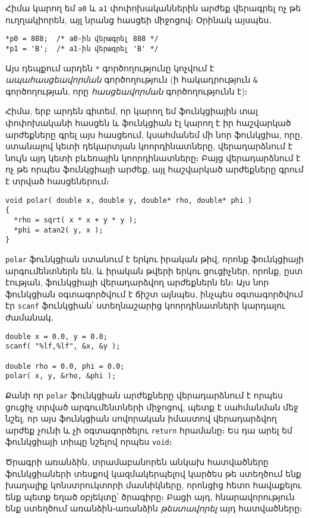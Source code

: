 Հիմա կարող եմ \texttt{a0} և \texttt{a1} փոփոխականներին արժեք վերագրել ոչ թե
ուղղակիորեն, այլ նրանց հասցեի միջոցով։ Օրինակ այսպես․

\begin{Verbatim}
*p0 = 888;  /* a0-ին վերագրել 888 */
*p1 = 'B';  /* a1-ին վերագրել 'B' */
\end{Verbatim}

Այս դեպքում արդեն \verb|*| գործողությունը կոչվում է \emph{ապահասցեավորման}
գործողություն (ի հակադրություն \verb|&| գործողության, որը \emph{հասցեավորման}
գործողությունն է)։

Հիմա, երբ արդեն գիտեմ, որ կարող եմ ֆունկցիային տալ փոփոխականի հասցեն և
ֆունկցիան էլ կարող է իր հաշվարկած արժեքները գրել այս հասցեում, կսահմանեմ
մի նոր ֆունկցիա, որը, ստանալով կետի դեկարտյան կոորդինատները, վերադարձնում
է նույն այդ կետի բևեռային կոորդինատները։ Բայց վերադարձնում է ոչ թե որպես
ֆունկցիայի արժեք, այլ հաշվարկած արժեքները գրում է տրված հասցեներում։

\begin{Verbatim}
void polar( double x, double y, double* rho, double* phi )
{
  *rho = sqrt( x * x + y * y );
  *phi = atan2( y, x );
}
\end{Verbatim}

\texttt{polar} ֆունկցիան ստանում է երկու իրական թիվ, որոնք ֆունկցիայի
արգումենտներն են, և իրական թվերի երկու ցուցիչներ, որոնք, ըստ էության,
ֆունկցիայի վերադարձվող արժեքներն են։ Այս նոր ֆունկցիան օգտագործվում է
ճիշտ այնպես, ինչպես օգտագործվում էր \texttt{scanf} ֆունկցիան՝ ստեղնաշարից
կոորդինատների կարդալու ժամանակ․

\begin{Verbatim}
double x = 0.0, y = 0.0;
scanf( "%lf,%lf", &x, &y );

double rho = 0.0, phi = 0.0;
polar( x, y, &rho, &phi );
\end{Verbatim}

Քանի որ \texttt{polar} ֆունկցիան արժեքները վերադարձնում է որպես ցուցիչ
տրված արգումենտների միջոցով, պետք է սահմանման մեջ նշել, որ այս ֆունկցիան
սովորական իմաստով վերադարձվող արժեք չունի և չի օգտագործելու \texttt{return}
հրամանը։ Ես դա արել եմ ֆունկցիայի տիպը նշելով որպես \texttt{void}։


Ծրագրի առանձին, տրամաբանորեն անկախ հատվածները ֆունկցիաների տեսքով
կազմակերպելով կարծես թե ստեղծում ենք խաղալիք կոնստրուկտորի մասնիկները,
որոնցից հետո հավաքելու ենք պետք եղած օբյեկտը՝ ծրագիրը։ Բացի այդ,
հնարավորություն ենք ստեղծում առանձին֊առանձին \emph{թեստավորել} այդ հատվածները։



